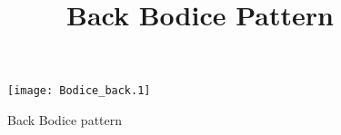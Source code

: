 \documentclass[a4paper]{article}
\begin{document}
\date{}
\title {Back Bodice Pattern}
\maketitle

\begin{figure}[!ht]

\texttt{[image: Bodice\_back.1]}
\caption{Back Bodice pattern}

\end{figure}
\end{document}
